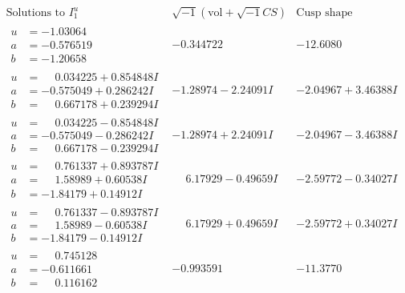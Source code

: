 \documentclass[1p]{elsarticle_modified}
\theoremstyle{definition}
\newcommand{\I}{\sqrt{-1}}
\begin{document}
$$\begin{array}{c|c|c}  
\text{Solutions to }I^u_{1}& \I (\text{vol} + \sqrt{-1}CS) & \text{Cusp shape}\\
 \hline 
\begin{aligned}
u &= -1.03064\phantom{ +0.000000I} \\
a &= -0.576519\phantom{ +0.000000I} \\
b &= -1.20658\phantom{ +0.000000I}\end{aligned}
 & -0.344722\phantom{ +0.000000I} & -12.6080\phantom{ +0.000000I} \\ \hline\begin{aligned}
u &= \phantom{-}0.034225 + 0.854848 I \\
a &= -0.575049 + 0.286242 I \\
b &= \phantom{-}0.667178 + 0.239294 I\end{aligned}
 & -1.28974 - 2.24091 I & -2.04967 + 3.46388 I \\ \hline\begin{aligned}
u &= \phantom{-}0.034225 - 0.854848 I \\
a &= -0.575049 - 0.286242 I \\
b &= \phantom{-}0.667178 - 0.239294 I\end{aligned}
 & -1.28974 + 2.24091 I & -2.04967 - 3.46388 I \\ \hline\begin{aligned}
u &= \phantom{-}0.761337 + 0.893787 I \\
a &= \phantom{-}1.58989 + 0.60538 I \\
b &= -1.84179 + 0.14912 I\end{aligned}
 & \phantom{-}6.17929 - 0.49659 I & -2.59772 - 0.34027 I \\ \hline\begin{aligned}
u &= \phantom{-}0.761337 - 0.893787 I \\
a &= \phantom{-}1.58989 - 0.60538 I \\
b &= -1.84179 - 0.14912 I\end{aligned}
 & \phantom{-}6.17929 + 0.49659 I & -2.59772 + 0.34027 I \\ \hline\begin{aligned}
u &= \phantom{-}0.745128\phantom{ +0.000000I} \\
a &= -0.611661\phantom{ +0.000000I} \\
b &= \phantom{-}0.116162\phantom{ +0.000000I}\end{aligned}
 & -0.993591\phantom{ +0.000000I} & -11.3770\phantom{ +0.000000I} \\ \hline\begin{aligned}

\end{aligned}
\end{array}$$
\end{document}
